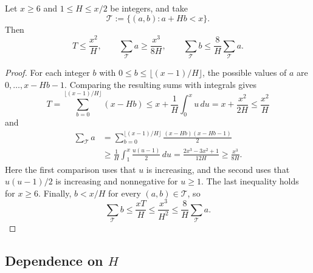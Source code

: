 \documentclass[reqno]{amsart} 
\begin{document}
\begin{lemma}\label{lemma:triangle-estimates}
  Let $x \geq 6$ and $1 \leq H \leq x/2$ be integers, and take
  \begin{equation*}
    \mathcal{T} := \{(a, b) : a + H b < x\}.
  \end{equation*}
  Then
  \begin{equation*}
    T \leq \frac{x^2}{H}, \qquad
    \sum_{\mathcal{T}} a \geq \frac{x^3}{8H}, \qquad
    \sum_{\mathcal{T}} b \leq \frac{8}{H}\sum_{\mathcal{T}} a.
  \end{equation*}
\end{lemma}
\begin{proof}
  For each integer $b$ with $0 \leq b \leq \lfloor(x - 1)/H\rfloor$, the possible values of $a$ are $0, \dotsc, x - Hb - 1$.  Comparing the resulting sums with integrals gives
  \begin{equation*}
    T = \sum_{b = 0}^{\lfloor(x - 1)/H\rfloor}(x - Hb)
    \leq x + \frac{1}{H}\int_0^x u \, d u
    = x + \frac{x^2}{2H}
    \leq \frac{x^2}{H}
  \end{equation*}
  and
  \begin{equation*}
    \begin{split}
      \sum_{\mathcal{T}} a
      &= \sum_{b = 0}^{\lfloor(x - 1)/H\rfloor}\frac{(x - Hb)(x - Hb - 1)}{2} \\
      &\geq \frac{1}{H}\int_1^x \frac{u(u - 1)}{2} \, d u
      = \frac{2x^3 - 3x^2 + 1}{12H}
      \geq \frac{x^3}{8H}.
    \end{split}
  \end{equation*}
  Here the first comparison uses that $u$ is increasing, and the second uses that $u(u - 1)/2$ is increasing and nonnegative for $u \geq 1$.  The last inequality holds for $x \geq 6$.  Finally, $b < x/H$ for every $(a, b) \in \mathcal{T}$, so
  \begin{equation*}
    \sum_{\mathcal{T}} b
    \leq \frac{xT}{H}
    \leq \frac{x^3}{H^2}
    \leq \frac{8}{H}\sum_{\mathcal{T}} a.
  \end{equation*}
\end{proof}

\subsection{Dependence on $H$}\label{sec:cus71nhv9g}
\end{document}
